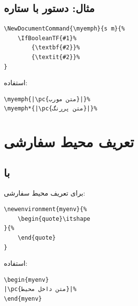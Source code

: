 
\subsection{مثال: دستور با ستاره}
\label{sec:custom-commands-star}

\begin{latin}
\begin{verbatim}
\NewDocumentCommand{\myemph}{s m}{%
    \IfBooleanTF{#1}%
        {\textbf{#2}}%
        {\textit{#2}}%
}
\end{verbatim}
\end{latin}

استفاده:

\begin{latin}
\begin{verbatim}
\myemph{|\pc{متن مورب}|}%
\myemph*{|\pc{متن پررنگ}|}%
\end{verbatim}
\end{latin}


\section{تعریف محیط سفارشی}
\label{sec:custom-commands-env}

\subsection{با }
\label{sec:custom-commands-newenv}

برای تعریف محیط سفارشی:

\begin{latin}
\begin{verbatim}
\newenvironment{myenv}{%
    \begin{quote}\itshape
}{%
    \end{quote}
}
\end{verbatim}
\end{latin}

استفاده:

\begin{latin}
\begin{verbatim}
\begin{myenv}
|\pc{متن داخل محیط}|%
\end{myenv}
\end{verbatim}
\end{latin}

